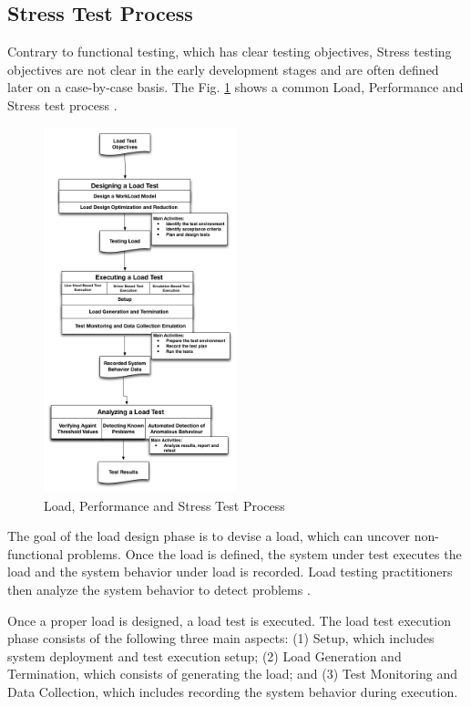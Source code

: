 \documentclass[times]{stvrauth}
\begin{document}
\subsection{Stress Test Process}

Contrary to functional testing, which has clear testing objectives, Stress testing objectives are not clear in the early development stages and are often defined later on a case-by-case basis. The Fig. \ref{fig:testprocess} shows a common Load, Performance and Stress test process  \cite{Jiang2010}.

\begin{figure}[!ht]
\centering
\includegraphics[width=0.5\textwidth]{./images/testprocess.png}
\caption{Load, Performance and Stress Test Process \cite{Jiang2010}\cite{Erinle2013}}
\label{fig:testprocess}
\end{figure}


The goal of the load design phase is to devise a load, which can uncover non-functional problems. Once the load is defined, the system under test executes the load and the system behavior under load is recorded. Load testing practitioners then analyze the system behavior to detect problems \cite{Jiang2010}. 

Once a proper load is designed, a load test is executed. The load test execution phase consists of the following three main aspects: (1) Setup, which includes system deployment and test execution setup; (2) Load Generation and Termination, which consists of generating the load; and (3) Test Monitoring and Data Collection, which includes recording the system behavior during execution\cite{Jiang2010}. 
\end{document}
